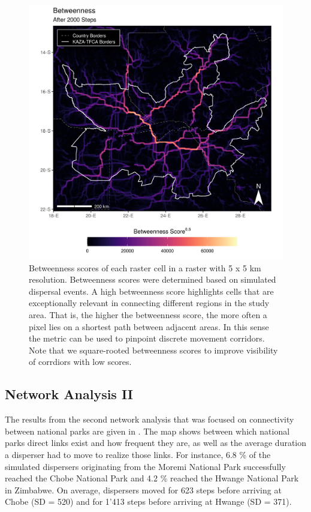 \documentclass[abstract=on,10pt,a4paper,bibliography=totocnumbered]{article}
\begin{document}
\begin{figure}
  \includegraphics[width=\textwidth]{99_Betweenness.png}
  \caption{Betweenness scores of each raster cell in a raster with 5 x 5 km
  resolution. Betweenness scores were determined based on simulated dispersal
  events. A high betweenness score highlights cells that are exceptionally
  relevant in connecting different regions in the study area. That is, the
  higher the betweenness score, the more often a pixel lies on a shortest path
  between adjacent areas. In this sense the metric can be used to pinpoint
  discrete movement corridors. Note that we square-rooted betweenness scores to
  improve visibility of corrdiors with low scores.}
  \label{Betweenness}
\end{figure}

\subsection{Network Analysis II}
The results from the second network analysis that was focused on connectivity
between national parks are given in . The map shows between
which national parks direct links exist and how frequent they are, as well as
the average duration a disperser had to move to realize those links. For
instance, 6.8 \% of the simulated dispersers originating from the Moremi
National Park successfully reached the Chobe National Park and 4.2 \% reached
the Hwange National Park in Zimbabwe. On average, dispersers moved for 623 steps
before arriving at Chobe (SD = 520) and for 1'413 steps before arriving at
Hwange (SD = 371).
\end{document}
